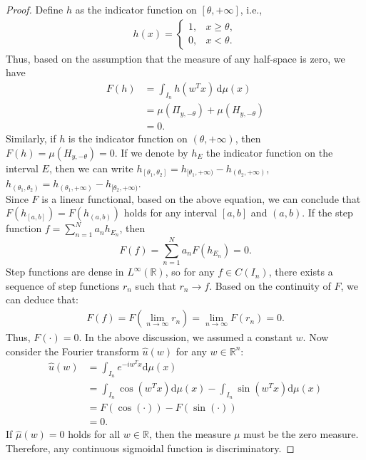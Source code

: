 \documentclass[12pt]{article}
\begin{document}
\begin{proof}
Define $h$ as the indicator function on $[\theta, +\infty]$, i.e.,
\begin{align*}
    h(x) = \begin{cases}
        1, & x \geq \theta, \\
        0, & x < \theta.
    \end{cases}
\end{align*}
Thus, based on the assumption that the measure of any half-space is zero, we have
\begin{align*}
    F(h) &= \int_{I_n} h(w^T x) \, \mathrm{d}\mu(x) \\
    &= \mu(\Pi_{y, -\theta}) + \mu(H_{y, -\theta}) \\
    &= 0.
\end{align*}
Similarly, if $h$ is the indicator function on $(\theta, +\infty)$, then $F(h) = \mu(H_{y, -\theta}) = 0$. If we denote by $h_E$ the indicator function on the interval $E$, then we can write
$
    h_{[\theta_1,\theta_2]}=h_{[\theta_1,+\infty)}-h_{(\theta_2,+\infty)}$,
    $h_{(\theta_1,\theta_2)}=h_{(\theta_1,+\infty)}-h_{[\theta_2,+\infty)}
$.
\\

Since $F$ is a linear functional, based on the above equation, we can conclude that $F(h_{[a,b]}) = F(h_{(a,b)})$ holds for any interval $[a,b]$ and $(a,b)$. If the step function $f = \sum_{n=1}^N a_n h_{E_n}$, then
$$
F(f) = \sum_{n=1}^N a_n F(h_{E_n}) = 0.
$$
Step functions are dense in $L^{\infty}(\mathbb{R})$, so for any $f \in C(I_n)$, there exists a sequence of step functions $r_n$ such that $r_n \to f$. Based on the continuity of $F$, we can deduce that:
\begin{align*}
    F(f)=F(\lim_{n\to\infty}r_n)=\lim_{n\to\infty} F(r_n)=0.
\end{align*}
Thus, $F(\cdot) = 0$. In the above discussion, we assumed a constant $w$. Now consider the Fourier transform $\hat{u}(w)$ for any $w \in \mathbb{R}^n$:
\begin{align*}
    \hat{u}(w)&=\int_{I_n} e^{-iw^Tx}\mathrm{d}\mu(x)\\
    &=\int_{I_n} \cos(w^Tx)\mathrm{d}\mu(x)-\int_{I_n} \sin(w^Tx)\mathrm{d}\mu(x)\\
    &=F(\cos(\cdot))-F(\sin(\cdot))\\
    &=0.
\end{align*}
If $\hat{\mu}(w) = 0$ holds for all $w \in \mathbb{R}$, then the measure $\mu$ must be the zero measure. Therefore, any continuous sigmoidal function is discriminatory.
\end{proof}
\end{document}
